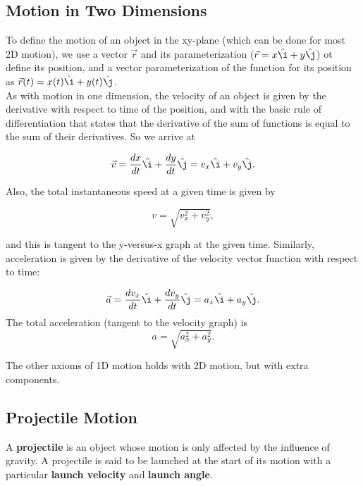 \documentclass[12pt,letterpaper]{article}
\newcommand{\ihat}{\hat{\i}}
\newcommand{\jhat}{\hat{\j}}
\begin{document}
\subsection{Motion in Two Dimensions}

To define the motion of an object in the xy-plane (which can be done for most 2D motion), we use a vector $\vec{r}$ and its parameterization ($\vec{r} = x\ihat + y\jhat$) ot define its position, and a vector parameterization of the function for its position as $\vec{r}(t) = x(t)\ihat + y(t)\jhat$. \\

As with motion in one dimension, the velocity of an object is given by the derivative with respect to time of the position, and with the basic rule of differentiation that states that the derivative of the sum of functions is equal to the sum of their derivatives. So we arrive at

\begin{center}
	$$\vec{v} = \frac{dx}{dt}\ihat + \frac{dy}{dt}\jhat = v_{x}\ihat + v_{y}\jhat.$$ \linebreak
\end{center}

Also, the total instantaneous speed at a given time is given by

\begin{center}
	$$v = \sqrt{v_{x}^{2} + v_{y}^{2}},$$ \linebreak
\end{center}

and this is tangent to the y-versus-x graph at the given time. Similarly, acceleration is given by the derivative of the velocity vector function with respect to time:

\begin{center}
	$$\vec{a} = \frac{dv_{x}}{dt}\ihat + \frac{dv_{y}}{dt}\jhat = a_{x}\ihat + a_{y}\jhat.$$ The total acceleration (tangent to the velocity graph) is
	$$a = \sqrt{a_{x}^{2} + a_{y}^{2}}.$$ \linebreak
\end{center}

The other axioms of 1D motion holds with 2D motion, but with extra components.

\subsection{Projectile Motion}

A \textbf{projectile} is an object whose motion is only affected by the influence of gravity. A projectile is said to be launched at the start of its motion with a particular \textbf{launch velocity} and \textbf{launch angle}.
\end{document}
